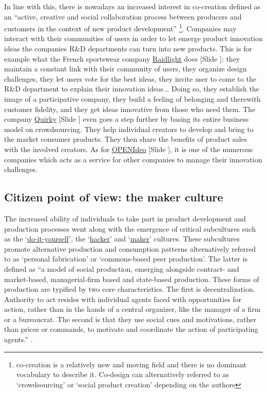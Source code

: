\documentclass{article}
\newcounter{slide}
\begin{document}
In line with this, there is nowadays an increased interest in co-creation defined as an ``active, creative and social collaboration process between producers and customers in the context of new product development'' \cite{pillerSocialMediaSocial2011} \footnote{co-creation is a relatively new and moving field and there is no dominant vocabulary to describe it. Co-design can alternatively referred to as `crowdsourcing' or `social product creation' depending on the authors}. Companies may interact with their communities of users in order to let emerge product innovation ideas the companies R\&D departments can turn into new products. This is for example what the French sportswear company \href{https://team.fr.raidlight.com/categories/atelier-de-conception-ouvert-a-tous.369/}{Raidlight} does {\color{blue}[Slide ]}: they maintain a constant link with their community of users, they organize design challenges, they let users vote for the best ideas, they invite user to come to the R\&D department to explain their innovation ideas... Doing so, they establish the image of a participative company, they build a feeling of belonging and therewith customer fidelity, and they get ideas innovative from those who need them. The company \href{https://quirky.com}{Quirky} {\color{blue}[Slide ]} even goes a step further by basing its entire business model on crowdsourcing. They help individual creators to develop and bring to the market consumer products. They then share the benefits of product sales with the involved creators. As for \href{https://www.openideo.com/}{OPENIdeo} {\color{blue}[Slide ]}, it is one of the numerous companies which acts as a service for other companies to manage their innovation challenges. 

\subsection{Citizen point of view: the maker culture}
\label{sec:maker}
The increased ability of individuals to take part in product development and production processes went along with the emergence of critical subcultures such as the `\href{https://en.wikipedia.org/wiki/DIY_ethic}{do-it-yourself}', the `\href{https://en.wikipedia.org/wiki/Hacker_culture}{hacker}' and `\href{https://en.wikipedia.org/wiki/Maker_culture}{maker}' cultures. These subcultures promote alternative production and consumption patterns alternatively referred to as `personal fabrication' \cite{gershenfeldFabComingRevolution2007} or `commons-based peer production'. The latter is defined as ``a model of social production, emerging alongside contract- and market-based, managerial-firm based and state-based production. These forms of production are typified by two core characteristics. The first is decentralization. Authority to act resides with individual agents faced with opportunities for action, rather than in the hands of a central organizer, like the manager of a firm or a bureaucrat. The second is that they use social cues and motivations, rather than prices or commands, to motivate and coordinate the action of participating agents.'' \cite{benklerCommonsbasedPeerProduction2006}.
\end{document}
